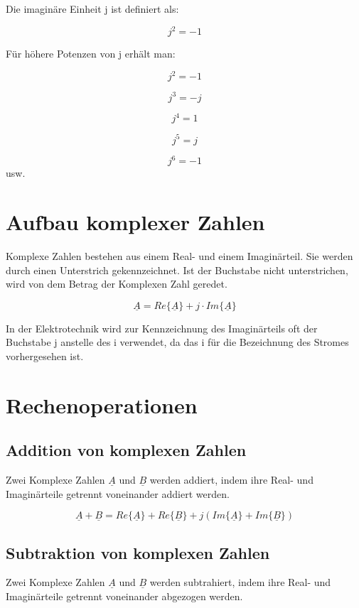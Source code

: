 \documentclass[
  ngerman,
  letterpaper,
]{scrbook}
\begin{document}
Die imaginäre Einheit j ist definiert als:

\[j^2 = -1\]

Für höhere Potenzen von j erhält man:

\[j^2 = -1\]

\[j^3 = -j\]

\[j^4 = 1\]

\[j^5 = j\]

\[j^6 = -1\] usw.

\section{Aufbau komplexer Zahlen}\label{aufbau-komplexer-zahlen}

Komplexe Zahlen bestehen aus einem Real- und einem Imaginärteil. Sie
werden durch einen Unterstrich gekennzeichnet. Ist der Buchstabe nicht
unterstrichen, wird von dem Betrag der Komplexen Zahl geredet.

\[\underline{A} = Re\{\underline{A}\} + j \cdot Im\{\underline{A}\}\]

In der Elektrotechnik wird zur Kennzeichnung des Imaginärteils oft der
Buchstabe j anstelle des i verwendet, da das i für die Bezeichnung des
Stromes vorhergesehen ist.

\section{Rechenoperationen}\label{rechenoperationen}

\subsection{Addition von komplexen
Zahlen}\label{addition-von-komplexen-zahlen}

Zwei Komplexe Zahlen \(\underline{A}\) und \(\underline{B}\) werden
addiert, indem ihre Real- und Imaginärteile getrennt voneinander addiert
werden.

\[
\underline{A} + \underline{B} = Re\{\underline{A}\} + Re\{\underline{B}\} + j(Im\{\underline{A}\} + Im\{\underline{B}\})
\]

\subsection{Subtraktion von komplexen
Zahlen}\label{subtraktion-von-komplexen-zahlen}

Zwei Komplexe Zahlen \(\underline{A}\) und \(\underline{B}\) werden
subtrahiert, indem ihre Real- und Imaginärteile getrennt voneinander
abgezogen werden.
\end{document}
